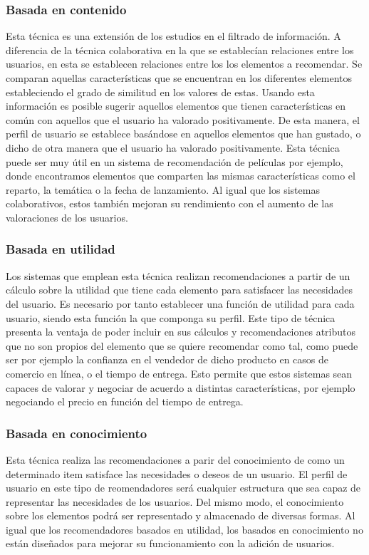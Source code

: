 \subsubsection{Basada en contenido}
Esta técnica es una extensión de los estudios en el filtrado de información. A diferencia de la técnica colaborativa en la que se establecían relaciones entre los usuarios, en esta se establecen relaciones entre los los elementos a recomendar. Se comparan aquellas características que se encuentran en los diferentes elementos estableciendo el grado de similitud en los valores de estas. Usando esta información es posible sugerir aquellos elementos que tienen características en común con aquellos que el usuario ha valorado positivamente. De esta manera, el perfil de usuario se establece basándose en aquellos elementos que han gustado, o dicho de otra manera que el usuario ha valorado positivamente. Esta técnica puede ser muy útil en un sistema de recomendación de películas por ejemplo, donde encontramos elementos que comparten las mismas características como el reparto, la temática o la fecha de lanzamiento. Al igual que los sistemas colaborativos, estos también mejoran su rendimiento con el aumento de las valoraciones de los usuarios.

\subsubsection{Basada en utilidad}
Los sistemas que emplean esta técnica realizan recomendaciones a partir de un cálculo sobre la utilidad que tiene cada elemento para satisfacer las necesidades del usuario. Es necesario por tanto establecer una función de utilidad para cada usuario, siendo esta función la que componga su perfil. Este tipo de técnica presenta la ventaja de poder incluir en sus cálculos y recomendaciones atributos que no son propios del elemento que se quiere recomendar como tal, como puede ser por ejemplo la confianza en el vendedor de dicho producto en casos de comercio en línea, o el tiempo de entrega. Esto permite que estos sistemas sean capaces de valorar y negociar de acuerdo a distintas características, por ejemplo negociando el precio en función del tiempo de entrega.

\subsubsection{Basada en conocimiento}
Esta técnica realiza las recomendaciones a parir del conocimiento de como un determinado item satisface las necesidades o deseos de un usuario. El perfil de usuario en este tipo de reomendadores será cualquier estructura que sea capaz de representar las necesidades de los usuarios. Del mismo modo, el conocimiento sobre los elementos podrá ser representado y almacenado de diversas formas. Al igual que los recomendadores basados en utilidad, los basados en conocimiento no están diseñados para mejorar su funcionamiento con la adición de usuarios.

